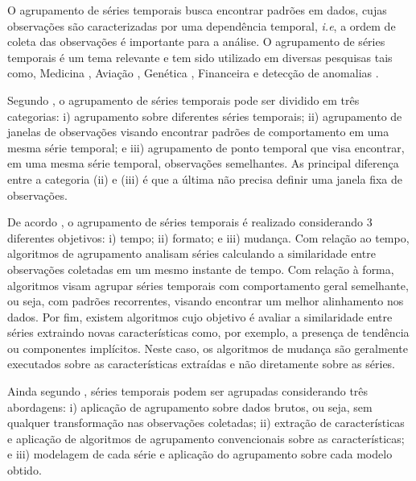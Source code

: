  
O agrupamento de séries temporais busca encontrar padrões em dados, cujas observações são caracterizadas por uma dependência temporal, \emph{i.e}, a ordem de coleta das observações é importante para a análise. O agrupamento de séries temporais é um tema relevante e tem sido utilizado em diversas pesquisas tais como, Medicina \cite{blei2015}, Aviação \cite{Ayhan2016} , Genética \cite{izakian}, Financeira \cite{durante} e detecção de anomalias \cite{Esling2012,Aghabozorgi2015}.


Segundo , o agrupamento de séries temporais pode ser dividido em três categorias: i) agrupamento sobre diferentes séries temporais; ii) agrupamento de janelas de observações visando encontrar padrões de comportamento em uma mesma série temporal; e iii) agrupamento de ponto temporal que visa encontrar, em uma mesma série temporal, observações semelhantes. As principal diferença entre a categoria (ii) e (iii) é que a última não precisa definir uma janela fixa de observações.

De acordo , o agrupamento de séries temporais é realizado considerando $3$ diferentes objetivos: i) tempo; ii) formato; e iii) mudança. Com relação ao tempo, algoritmos de agrupamento analisam séries calculando a similaridade entre observações coletadas em um mesmo instante de tempo. Com relação à forma, algoritmos visam agrupar séries temporais com comportamento geral semelhante, ou seja, com padrões recorrentes, visando encontrar um melhor alinhamento nos dados. Por fim, existem algoritmos cujo objetivo é avaliar a similaridade entre séries extraindo novas características como, por exemplo, a presença de tendência ou componentes implícitos. Neste caso, os algoritmos de mudança são geralmente executados sobre as características extraídas e não diretamente sobre as séries.

Ainda segundo , séries temporais podem ser agrupadas considerando três abordagens: i) aplicação de agrupamento sobre dados brutos, ou seja, sem qualquer transformação nas observações coletadas; ii) extração de características e aplicação de algoritmos de agrupamento convencionais sobre as características; e iii) modelagem de cada série e aplicação do agrupamento sobre cada modelo obtido.

